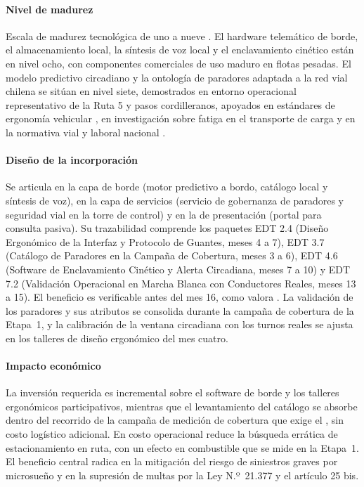 \paragraph{Nivel de madurez} Escala de madurez tecnológica de uno a nueve \parencite{iso16290}. El
hardware telemático de borde, el almacenamiento local, la síntesis de voz local y el enclavamiento
cinético están en nivel ocho, con componentes comerciales de uso maduro en flotas pesadas. El modelo
predictivo circadiano y la ontología de paradores adaptada a la red vial chilena se sitúan en nivel
siete, demostrados en entorno operacional representativo de la Ruta 5 y pasos cordilleranos, apoyados
en estándares de ergonomía vehicular \parencite{iso15005,iso9241_210}, en investigación sobre fatiga en
el transporte de carga \parencite{nasem2016_fatiga} y en la normativa vial y laboral nacional
\parencite{ley21377,codigo_trabajo_25bis}.

\paragraph{Diseño de la incorporación} Se articula en la capa de borde (motor predictivo a bordo,
catálogo local y síntesis de voz), en la capa de servicios (servicio de gobernanza de paradores y
seguridad vial en la torre de control) y en la de presentación (portal para consulta pasiva). Su
trazabilidad comprende los paquetes EDT 2.4 (Diseño Ergonómico de la Interfaz y Protocolo de Guantes,
meses 4 a 7), EDT 3.7 (Catálogo de Paradores en la Campaña de Cobertura, meses 3 a 6),
EDT 4.6 (Software de Enclavamiento Cinético y Alerta Circadiana, meses 7 a 10) y EDT 7.2 (Validación
Operacional en Marcha Blanca con Conductores Reales, meses 13 a 15). El beneficio es verificable antes
del mes 16, como valora . La validación de los paradores y sus atributos se
consolida durante la campaña de cobertura de la Etapa~1, y la calibración de la ventana circadiana con
los turnos reales se ajusta en los talleres de diseño ergonómico del mes cuatro.


\paragraph{Impacto económico} La inversión requerida es incremental sobre el software de borde y los
talleres ergonómicos participativos, mientras que el levantamiento del catálogo se absorbe dentro del
recorrido de la campaña de medición de cobertura que exige el , sin costo
logístico adicional. En costo operacional
reduce la búsqueda errática de estacionamiento en ruta, con un efecto en combustible que se mide en la
Etapa~1. El beneficio central radica en la mitigación del riesgo de siniestros graves por microsueño y
en la supresión de multas por la Ley N.º~21.377 y el artículo 25 bis.

